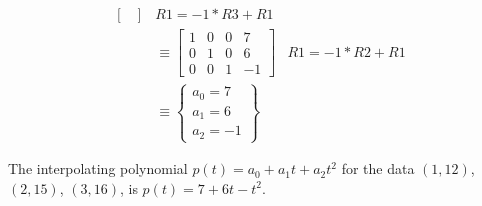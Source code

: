 \documentclass{mathhomework}
\begin{document}
\begin{problem}[1.2\#33]
\begin{solution}
\begin{align*}
\begin{bmatrix}
            \end{bmatrix}
            & R1 = -1 * R3 + R1 \\ & \equiv
            \begin{bmatrix}
                1 & 0 & 0 & 7 \\
                0 & 1 & 0 & 6 \\
                0 & 0 & 1 & -1
            \end{bmatrix}
            & R1 = -1 * R2 + R1 \\ & \equiv
            \begin{Bmatrix}
                a_0 = 7 \\
                a_1 = 6 \\
                a_2 = -1
            \end{Bmatrix}
        \end{align*}
    
        The interpolating polynomial $p(t) = a_0 + a_1t + a_2t^2$ for the data $(1,12)$, $(2,15)$, $(3,16)$, is $p(t) = 7 + 6t - t^2$.
    \end{solution}
\end{problem}
\end{document}
